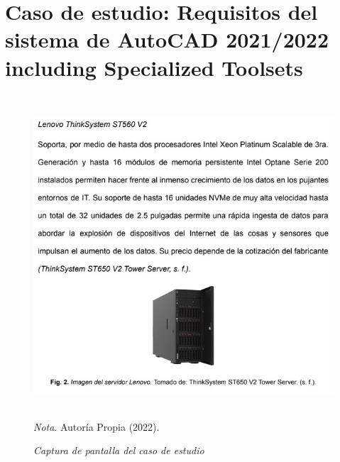 \documentclass[stu, 12pt, letterpaper, donotrepeattitle, floatsintext, natbib]{apa7}
\begin{document}
\section{Caso de estudio: Requisitos del sistema de AutoCAD 2021/2022 including Specialized Toolsets}
\begin{figure}[H]
    \caption{\emph{Captura de pantalla del caso de estudio\\}}
    \centering
    \smallskip
    \includegraphics[width=17cm, height=12cm]{caso.jpg}
    \bigskip
    \justifying\small\textit{Nota}. %
    Autoría Propia (2022).
\end{figure}
\vspace{\baselineskip}
\end{document}
